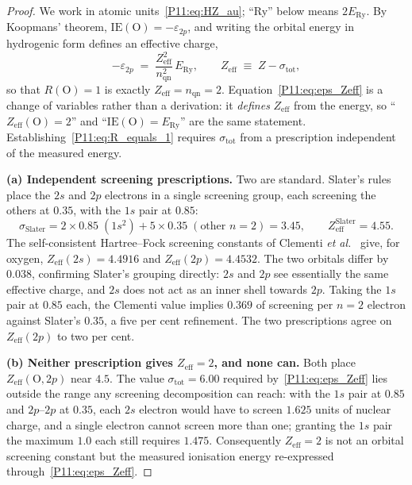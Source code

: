 \documentclass[11pt,a4paper]{article}
\theoremstyle{definition}
\theoremstyle{remark}
\newcommand{\ERy}{E_{\mathrm{Ry}}}
\newcommand{\IE}{\mathrm{IE}}
\begin{document}
\begin{proof}
We work in atomic units~\eqref{P11:eq:HZ_au}; ``Ry'' below means $2\ERy$.
By Koopmans' theorem, $\IE(\mathrm{O}) = -\varepsilon_{2p}$, and writing
the orbital energy in hydrogenic form defines an effective charge,
\begin{equation}
  -\varepsilon_{2p}
  \;=\; \frac{Z_\mathrm{eff}^2}{n_\mathrm{qn}^2}\,\ERy,
  \qquad
  Z_\mathrm{eff} \;\equiv\; Z - \sigma_\mathrm{tot},
  \label{P11:eq:eps_Zeff}
\end{equation}
so that $R(\mathrm{O})=1$ is exactly $Z_\mathrm{eff}=n_\mathrm{qn}=2$.
Equation~\eqref{P11:eq:eps_Zeff} is a change of variables rather than a
derivation: it \emph{defines} $Z_\mathrm{eff}$ from the energy, so
``$Z_\mathrm{eff}(\mathrm{O})=2$'' and ``$\IE(\mathrm{O})=\ERy$'' are
the same statement.  Establishing~\eqref{P11:eq:R_equals_1} requires
$\sigma_\mathrm{tot}$ from a prescription independent of the measured
energy.

\textbf{(a) Independent screening prescriptions.}
Two are standard.  Slater's rules~\cite{Slater1930} place the $2s$ and
$2p$ electrons in a single screening group, each screening the others
at $0.35$, with the $1s$ pair at $0.85$:
\begin{equation}
  \sigma_\mathrm{Slater}
  = 2\times0.85\;(1s^2) + 5\times0.35\;(\text{other } n{=}2)
  = 3.45,
  \qquad
  Z_\mathrm{eff}^\mathrm{Slater} = 4.55 .
  \label{P11:eq:sigma_slater}
\end{equation}
The self-consistent Hartree--Fock screening constants of Clementi
\emph{et al.}~\cite{Clementi1963} give, for oxygen,
$Z_\mathrm{eff}(2s)=4.4916$ and $Z_\mathrm{eff}(2p)=4.4532$.  The two
orbitals differ by $0.038$, confirming Slater's grouping directly: $2s$
and $2p$ see essentially the same effective charge, and $2s$ does not
act as an inner shell towards $2p$.  Taking the $1s$ pair at $0.85$
each, the Clementi value implies $0.369$ of screening per $n=2$
electron against Slater's $0.35$, a five per cent refinement.  The two
prescriptions agree on $Z_\mathrm{eff}(2p)$ to two per cent.

\textbf{(b) Neither prescription gives $Z_\mathrm{eff}=2$, and none can.}
Both place $Z_\mathrm{eff}(\mathrm{O},2p)$ near $4.5$.  The value
$\sigma_\mathrm{tot}=6.00$ required by~\eqref{P11:eq:eps_Zeff} lies
outside the range any screening decomposition can reach: with the $1s$
pair at $0.85$ and $2p$--$2p$ at $0.35$, each $2s$ electron would have
to screen $1.625$ units of nuclear charge, and a single electron cannot
screen more than one; granting the $1s$ pair the maximum $1.0$ each
still requires $1.475$.  Consequently $Z_\mathrm{eff}=2$ is not an
orbital screening constant but the measured ionisation energy
re-expressed through~\eqref{P11:eq:eps_Zeff}.


\end{proof}
\end{document}
